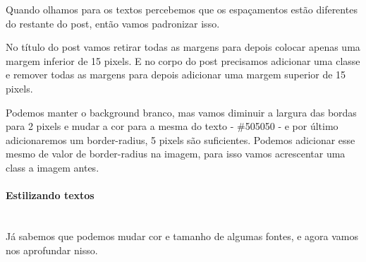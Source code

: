 \documentclass[12pt,a4paper]{article}
\begin{document}
	Quando olhamos para os textos percebemos que os espaçamentos estão diferentes do restante do post, então vamos padronizar isso.
	
	No título do post vamos retirar todas as margens para depois colocar apenas uma margem inferior de 15 pixels. E no corpo do post precisamos adicionar uma classe e remover todas as margens para depois adicionar uma margem superior de 15 pixels.
	
	Podemos manter o background branco, mas vamos diminuir a largura das bordas para 2 pixels e mudar a cor para a mesma do texto - \#505050 - e por último adicionaremos um border-radius, 5 pixels são suficientes. Podemos adicionar esse mesmo de valor de border-radius na imagem, para isso vamos acrescentar uma class a imagem antes.
	
	\paragraph{Estilizando textos} \mbox{} \\
	
	Já sabemos que podemos mudar cor e tamanho de algumas fontes, e agora vamos nos aprofundar nisso.
	
\end{document}
